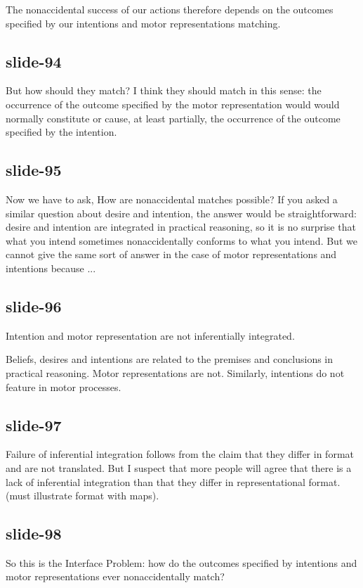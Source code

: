 \documentclass[12pt,\papersize]{extarticle}
\begin{document}
The nonaccidental success of our actions therefore depends on the outcomes
specified by our intentions and motor representations matching.
 
\subsection{slide-94}
But how should they match?
I think they should match in this sense:
the occurrence of the outcome specified by the motor representation would
would normally constitute or cause, at least
partially, the occurrence of the outcome specified by the intention.
 
\subsection{slide-95}
Now we have to ask, How are nonaccidental matches possible?
If you asked a similar question about desire and intention, the answer would be
straightforward: desire and intention are integrated in practical reasoning, so it
is no surprise that what you intend sometimes nonaccidentally conforms to what you intend.
But we cannot give the same sort of answer in the case of motor representations and
intentions because ...
 
\subsection{slide-96}
Intention and motor representation are not inferentially integrated.
 
Beliefs, desires and intentions are related to the premises and conclusions
in practical reasoning. Motor representations are not.
Similarly, intentions do not feature in motor processes.
 
\subsection{slide-97}
Failure of inferential integration follows from the claim that they differ in
format and are not translated. But I suspect that more people will agree that there is a
lack of inferential integration than that they differ in representational format.
(must illustrate format with maps).
 
\subsection{slide-98}
So this is the Interface Problem: how do the outcomes specified by intentions and
motor representations ever nonaccidentally match?
 
\end{document}
